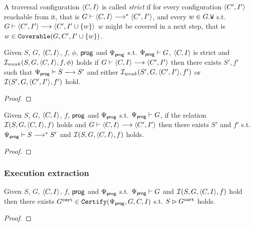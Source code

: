 \documentclass[12pt]{article}
\begin{document}
\begin{definition}
  A traversal configuration $\langle C, I \rangle$ is called \emph{strict}
  if for every configuration $\langle C', I' \rangle$ reachable from it,
  that is $G \vdash \langle C, I \rangle \longrightarrow^* \langle C', I' \rangle$,
  and every $w \in G.{\mathtt{W}}$ s.t.
  $G \vdash \langle C', I' \rangle \longrightarrow \langle C', I' \cup \{w\} \rangle$
  $w$ might be covered in a next step, that is
  $w \in {\mathtt{Coverable}}(G, C', I' \cup \{w\})$.
\end{definition}

\begin{lemma}
  Given $S$, $G$, $\langle C, I \rangle$, $f$, $\phi$, $\mathsf{prog}$ and $\Psi_{\mathsf{prog}}$
  s.t. $\Psi_{\mathsf{prog}} \vdash G$, $\langle C, I \rangle$ is strict
  and $\mathcal{I}_{weak}(S, G, \langle C, I \rangle, f, \phi)$ holds
  if $G \vdash \langle C, I \rangle \longrightarrow \langle C', I' \rangle$ then
  there exists $S', f'$ such that
  $\Execs{\Prog} \vdash S \esstep{} S'$
  and either $\mathcal{I}_{weak}(S', G, \langle C', I' \rangle, f')$
  or $\mathcal{I}(S', G, \langle C', I' \rangle, f')$ hold.
\end{lemma}

\begin{proof}

\end{proof}

\begin{lemma}
  Given $S$, $G$, $\langle C, I \rangle$, $f$, $\mathsf{prog}$ and $\Psi_{\mathsf{prog}}$
  s.t. $\Psi_{\mathsf{prog}} \vdash G$,
  if the relation $\mathcal{I}(S, G, \langle C, I \rangle, f)$ holds
  and $G \vdash \langle C, I \rangle \longrightarrow \langle C', I' \rangle$
  then there exists $S'$ and $f'$ s.t.
  $\Psi_{\mathsf{prog}} \vdash S \longrightarrow^* S'$ and
  $\mathcal{I}(S, G, \langle C, I \rangle, f)$ holds.
\end{lemma}

\begin{proof}
  
\end{proof}

\subsubsection{Execution extraction}

\begin{lemma}
  Given $S$, $G$, $\langle C, I \rangle$, $f$, $\mathsf{prog}$ and $\Psi_{\mathsf{prog}}$
  s.t. $\Psi_{\mathsf{prog}} \vdash G$ and $\mathcal{I}(S, G, \langle C, I \rangle, f)$ hold
  then there exists $G^{{\mathtt{cert}}} \in {\mathtt{Certify}}(\Psi_{\mathsf{prog}}, G, C, I)$ s.t.
  $S \rhd G^{{\mathtt{cert}}}$ holds.
\end{lemma}

\begin{proof}
  
\end{proof}
  
\setmonofont[Mapping=tex-text]{CMU Typewriter Text}


\end{document}
